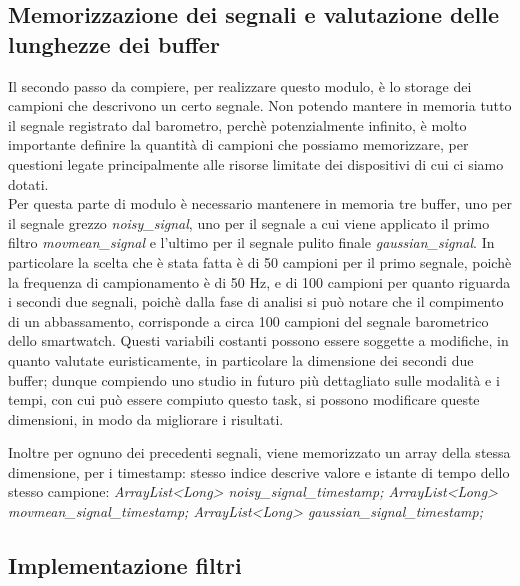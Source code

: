 \documentclass[a4paper, oneside]{book}
\begin{document}
\subsection{Memorizzazione dei segnali e valutazione delle lunghezze dei buffer}
Il secondo passo da compiere, per realizzare questo modulo, è lo storage dei campioni che descrivono un certo segnale. Non potendo mantere in memoria tutto il segnale registrato dal barometro, perchè potenzialmente infinito, è molto importante definire la quantità di campioni che possiamo memorizzare, per questioni legate principalmente alle risorse limitate dei dispositivi di cui ci siamo dotati. \\
Per questa parte di modulo è necessario mantenere in memoria tre buffer, uno per il segnale grezzo \textit{noisy\_signal}, uno per il segnale a cui viene applicato il primo filtro \textit{movmean\_signal} e l'ultimo per il segnale pulito finale \textit{gaussian\_signal}. In particolare la scelta che è stata fatta è di 50 campioni per il primo segnale, poichè la frequenza di campionamento è di 50 Hz, e di 100 campioni per quanto riguarda i secondi due segnali, poichè dalla fase di analisi si può notare che il compimento di un abbassamento, corrisponde a circa 100 campioni del segnale barometrico dello smartwatch. Questi variabili costanti possono essere soggette a modifiche, in quanto valutate euristicamente, in particolare la dimensione dei secondi due buffer; dunque compiendo uno studio in futuro più dettagliato sulle modalità e i tempi, con cui può essere compiuto questo task, si possono modificare queste dimensioni, in modo da migliorare i risultati. \\
\clearpage
 
\vspace{3mm}
Inoltre per ognuno dei precedenti segnali, viene memorizzato un array della stessa dimensione, per i timestamp: stesso indice descrive valore e istante di tempo dello stesso campione: \textit{ArrayList<Long> noisy\_signal\_timestamp; ArrayList<Long> movmean\_signal\_timestamp; ArrayList<Long> gaussian\_signal\_timestamp;}

\subsection{Implementazione filtri}
\vspace{2mm}

\vspace{5mm}
\end{document}

